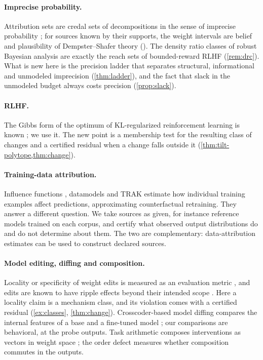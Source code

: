 \documentclass[11pt]{article}
\theoremstyle{definition}
\theoremstyle{remark}
\begin{document}
\paragraph{Imprecise probability.} Attribution sets are credal sets of decompositions in the sense of
imprecise probability \cite{Walley1991}; for sources known by their supports, the weight intervals are
belief and plausibility of Dempster--Shafer theory \cite{Dempster1967,Shafer1976}
(\cite[Prop.~5.8]{Awasthi-Tower}). The density ratio classes of robust Bayesian analysis
\cite{DeRobertisHartigan1981} are exactly the reach sets of bounded-reward RLHF (\cref{rem:drc}). What
is new here is the precision ladder that separates structural, informational and unmodeled
imprecision (\cref{thm:ladder}), and the fact that slack in the unmodeled budget always costs precision
(\cref{prop:slack}).

\paragraph{RLHF.} The Gibbs form of the optimum of KL-regularized reinforcement learning is known
\cite{Korbak2022,Rafailov2023}; we use it. The new point is a membership test for the resulting class of
changes and a certified residual when a change falls outside it (\cref{thm:tilt-polytope,thm:change}).

\paragraph{Training-data attribution.} Influence functions \cite{KohLiang2017}, datamodels
\cite{Ilyas2022} and TRAK \cite{Park2023} estimate how individual training examples affect predictions,
approximating counterfactual retraining. They answer a different question. We take sources as given,
for instance reference models trained on each corpus, and certify what observed output distributions
do and do not determine about them. The two are complementary: data-attribution estimates can be used
to construct declared sources.

\paragraph{Model editing, diffing and composition.} Locality or specificity of weight edits is measured
as an evaluation metric \cite{Meng2022}, and edits are known to have ripple effects beyond their
intended scope \cite{Cohen2024}. Here a locality claim is a mechanism class, and its violation comes
with a certified residual (\cref{ex:classes}, \cref{thm:change}). Crosscoder-based model diffing compares
the internal features of a base and a fine-tuned model \cite{Minder2025}; our comparisons are
behavioral, at the probe outputs. Task arithmetic composes interventions as vectors in weight space
\cite{Ilharco2023}; the order defect measures whether composition commutes in the outputs.
\end{document}
